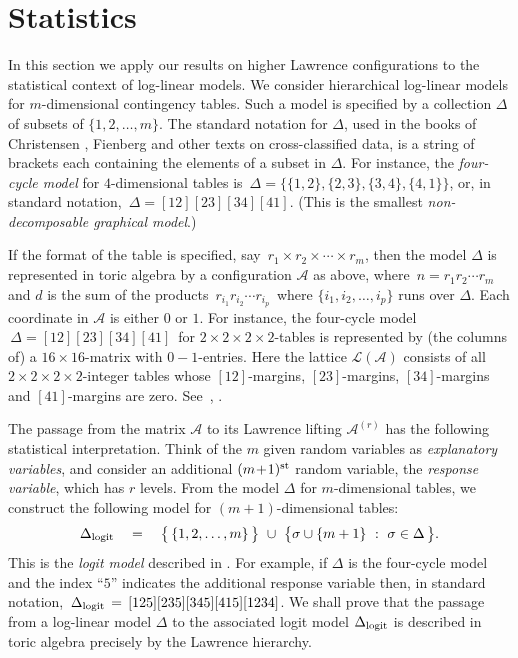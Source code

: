 \documentclass[11pt]{amsart}
\theoremstyle{definition}
\renewcommand{\L}{{\mathcal L}}
\newcommand{\A}{{\mathcal A}}
\begin{document}
  \section{\bf Statistics}

In this section we apply our results on higher Lawrence configurations
to the statistical context of log-linear models. We consider  
hierarchical
log-linear models for $m$-dimensional contingency tables. Such a model
is specified by a collection $\Delta$ of subsets of $\{1,2,\ldots,m\}$.
The standard notation for $\Delta$, used in the books of
Christensen \cite{Chr},  Fienberg \cite{Fie}
and other texts on cross-classified data,
is a string of brackets each containing the elements of a subset in  
$\Delta$.
For instance, the {\em four-cycle model} for $4$-dimensional tables
is $ \, \Delta = \bigl\{ \{1,2\} , \{2,3\}, \{3,4\}, \{4,1\} \bigr\}$,  
or,
in standard notation, $\, \Delta = [1 2][2 3][3 4][41]$.
(This is the smallest {\em non-decomposable graphical model}.)

If the format of the table is specified, say $\, r_1 \times r_2 \times
\cdots \times r_m$, then the model $\Delta$ is represented in toric
algebra by a configuration $\A$ as above, where $\, n = r_1 r_2 \cdots  
r_m \,$
and $d$ is the sum of the products $\, r_{i_1} r_{i_2} \cdots r_{i_p}  
\,$
where $\{ i_1,i_2, \ldots,i_p \}$ runs over $\Delta$.
  Each coordinate in $\A$ is either $0$ or $1$. For instance,
the four-cycle model $\, \Delta = [1 2][2 3][3 4][4 1]\,$ for
$2 \times 2 \times 2 \times 2$-tables is represented by
(the columns of) a $16 \times 16$-matrix with $0-1$-entries.
Here the lattice $\L ( \A )$ consists of all $2 \times 2 \times
2 \times 2$-integer tables whose
$[12]$-margins, $[23]$-margins, $[34]$-margins
and $[41]$-margins are zero.
See~\cite{GMS}, \cite{HS}.

The passage from the matrix $\A$ to its Lawrence lifting
$\A^{(r)}$ has the following statistical interpretation. Think of the
$m$ given random variables as {\em explanatory variables}, and consider
an additional $(m \! + \! 1)^{\rm st}$ random variable, the
{\em response variable}, which has $r$ levels. From the
model $\Delta$ for $m$-dimensional tables, we
construct the following model for $(m \! + \! 1)$-dimensional tables:
$$ \Delta_{\rm logit} \quad = \quad
\bigl\{ \, \{1,2,\ldots,m\} \, \bigr\} \,\, \cup \,\,
\bigl\{ \sigma \cup \{m+1\} \,\, :\,\, \sigma \in \Delta \,\bigr\}. $$
This is the {\em logit model} described in \cite[\S VII.1]{Chr}.
For example, if $\Delta$ is the four-cycle model and
the index ``$5$'' indicates
the additional response variable then, in standard notation,
$\, \Delta_{\rm logit} \,  =\,  [125][235][345][415][1234]$.
We shall prove that the passage from a log-linear model $\Delta$
to the associated logit model $\Delta_{\rm logit}$ is described
in toric algebra precisely by the Lawrence hierarchy.
\end{document}
